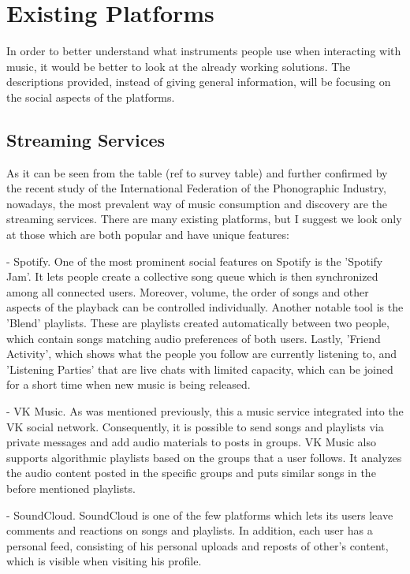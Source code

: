 \chapter{Existing Platforms}
In order to better understand what instruments people use when interacting with music, it would be better
to look at the already working solutions. The descriptions provided, instead of giving general information,
will be focusing on the social aspects of the platforms.


\section{Streaming Services}
As it can be seen from the table (ref to survey table) and further confirmed by
the recent study of the International Federation of the Phonographic Industry\cite{2},
nowadays, the most prevalent way of music consumption
and discovery are the streaming services. There are many existing platforms,
but I suggest we look only at those which are both popular and have unique features:

- Spotify.
One of the most prominent social features on Spotify is the 'Spotify Jam'\cite{3}.
It lets people create a collective song queue which is then synchronized among all connected users.
Moreover, volume, the order of songs and other aspects of the playback can be controlled individually.
Another notable tool is the 'Blend' playlists\cite{4}. These are playlists created automatically
between two people, which contain songs matching audio preferences of both users.
Lastly, 'Friend Activity'\cite{5}, which shows what the people you follow are currently listening to,
and 'Listening Parties' that are live chats with limited capacity,
which can be joined for a short time when new music is being released\cite{6,7}.

- VK Music.
As was mentioned previously, this a music service integrated into the VK social network.
Consequently, it is possible to send songs and playlists via private messages and add audio materials to
posts in groups. VK Music also supports algorithmic playlists based on the groups that a user follows.
It analyzes the audio content posted in the specific groups and puts similar songs in the before mentioned playlists.

- SoundCloud.
SoundCloud is one of the few platforms which lets its users leave comments and reactions on songs and playlists\cite{8,9}.
In addition, each user has a personal feed, consisting of his personal uploads and
reposts of other's content\cite{10}, which is visible when visiting his profile.

